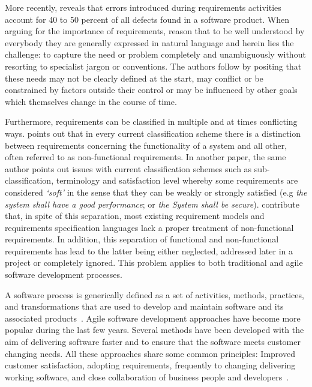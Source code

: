 \documentclass[dissertation,final]{softeng}
\begin{document}
{More recently, \citet{Davis200505} reveals that errors introduced during requirements activities account for 40 to 50 percent of all defects found in a software product.  When arguing for the importance of requirements, \citet{Hull2011} reason that to be well understood by everybody they are generally expressed in natural language and herein lies the challenge: to capture the need or problem completely and unambiguously without resorting to specialist jargon or conventions. The authors follow by positing that these needs may not be clearly defined at the start, may conflict or be constrained by factors outside their control or may be influenced by other goals which themselves change in the course of time.

Furthermore, requirements can be classified in multiple and at times conflicting ways. \citet{Glinz:2007ehba} points out that in every current classification scheme there is a distinction between requirements concerning the functionality of a system and all other, often referred to as non-functional requirements. In another paper, the same author points out issues with current classification schemes such as sub-classification, terminology and satisfaction level whereby some requirements are considered \emph{`soft'} in the sense that they can be weakly or strongly satisfied (e.g \emph{the system shall have a good performance}; or \emph{the System shall be secure}). \citet{Chung:2009vg} contribute that, in spite of this separation, most existing requirement models and requirements specification languages lack a proper treatment of non-functional requirements. In addition, this separation of functional and non-functional requirements has lead to the latter being either neglected, addressed later in a project or completely ignored. This problem applies to both traditional and agile software development processes. 

A software process is generically defined as a set of activities, methods, practices, and transformations that are used to develop and maintain software and its associated products~\citep{Cugola:1998htba}. Agile software development approaches have become more popular during the last few years. Several methods have been developed with the aim of delivering software faster and to ensure that the software meets customer changing needs. All these approaches share some common principles: Improved customer satisfaction, adopting requirements, frequently to changing delivering working software, and close collaboration of business people and developers~\citep{Paetsch:2003tl}.

}
\end{document}
